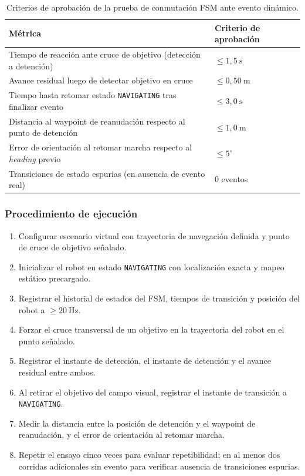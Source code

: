 \begin{table}[H]
\centering
\small
\begin{tabular}{p{8.8cm} p{4.1cm}}
\toprule
\textbf{Métrica} & \textbf{Criterio de aprobación} \\
\midrule
Tiempo de reacción ante cruce de objetivo (detección a detención) & $\leq 1{,}5\ \text{s}$ \\
Avance residual luego de detectar objetivo en cruce & $\leq 0{,}50\ \text{m}$ \\
Tiempo hasta retomar estado \texttt{NAVIGATING} tras finalizar evento & $\leq 3{,}0\ \text{s}$ \\
Distancia al waypoint de reanudación respecto al punto de detención & $\leq 1{,}0\ \text{m}$ \\
Error de orientación al retomar marcha respecto al \textit{heading} previo & $\leq 5^\circ$ \\
Transiciones de estado espurias (en ausencia de evento real) & 0 eventos \\
\bottomrule
\end{tabular}
\caption{Criterios de aprobación de la prueba de conmutación FSM ante evento dinámico.}
\label{tab:criterios_prueba_fsm}
\end{table}

\subsubsection{Procedimiento de ejecución}

\begin{enumerate}
    \item Configurar escenario virtual con trayectoria de navegación definida y punto de cruce de objetivo señalado.
    \item Inicializar el robot en estado \texttt{NAVIGATING} con localización exacta y mapeo estático precargado.
    \item Registrar el historial de estados del FSM, tiempos de transición y posición del robot a $\geq 20\ \text{Hz}$.
    \item Forzar el cruce transversal de un objetivo en la trayectoria del robot en el punto señalado.
    \item Registrar el instante de detección, el instante de detención y el avance residual entre ambos.
    \item Al retirar el objetivo del campo visual, registrar el instante de transición a \texttt{NAVIGATING}.
    \item Medir la distancia entre la posición de detención y el waypoint de reanudación, y el error de orientación al retomar marcha.
    \item Repetir el ensayo cinco veces para evaluar repetibilidad; en al menos dos corridas adicionales sin evento para verificar ausencia de transiciones espurias.
\end{enumerate}

